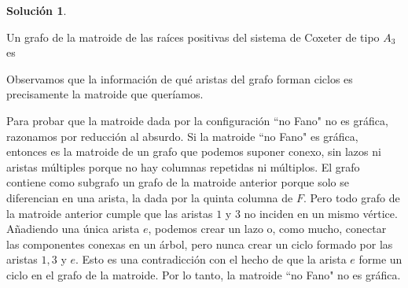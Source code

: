 \documentclass[10pt]{article}
\theoremstyle{definition}
\newtheorem*{sol}{Solución}
\begin{document}
\begin{sol}
\begin{enumerate}[(a)]

\end{enumerate}
Un grafo de la matroide de las raíces positivas del sistema de Coxeter de tipo $A_3$ es 
\begin{center}\end{center}
Observamos que la información de qué aristas del grafo forman ciclos es precisamente la matroide que queríamos.

Para probar que la matroide dada por la configuración ``no Fano" no es gráfica, razonamos por reducción al absurdo. Si la matroide ``no Fano" es gráfica, entonces es la matroide de un grafo que podemos suponer conexo, sin lazos ni aristas múltiples porque no hay columnas repetidas ni múltiplos. El grafo contiene como subgrafo un grafo de la matroide anterior porque solo se diferencian en una arista, la dada por la quinta columna de $F$. Pero todo grafo de la matroide anterior cumple que las aristas $1$ y $3$ no inciden en un mismo vértice. Añadiendo una única arista $e$, podemos crear un lazo o, como mucho, conectar las componentes conexas en un árbol, pero nunca crear un ciclo formado por las aristas $1, 3$ y $e$. Esto es una contradicción con el hecho de que la arista $e$ forme un ciclo en el grafo de la matroide. Por lo tanto, la matroide ``no Fano" no es gráfica.
\end{sol}
\end{document}
